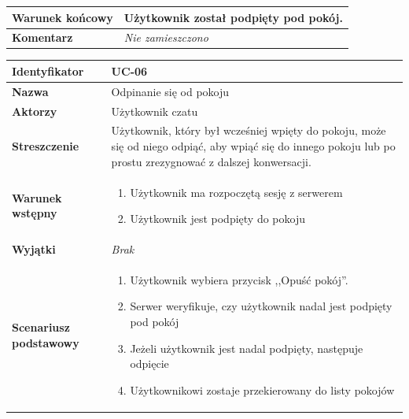 \documentclass[11pt,oneside,a4paper,titlepage,onecolumn]{article}
\newenvironment{enumreq}
{ \begin{enumerate}[topsep=0pt,itemsep=-1ex,partopsep=1ex,parsep=1ex] }
{ \end{enumerate}                  }
\begin{document}
{\begin{tabular}{ | l | l | }
	\hline
		\parbox[t]{4cm}{\textbf{Warunek końcowy}} & \parbox[t]{11cm}{
			Użytkownik został podpięty pod pokój.
		}
		\\
		
	\hline
		\parbox[t]{4cm}{\textbf{Komentarz}} & \parbox[t]{11cm}{
			\textit{Nie zamieszczono}
		}
		\\

	\hline
\end{tabular}

\vspace{2em}

\begin{tabular}{ | l | l | }
	\hline
		\textbf{Identyfikator} & 
		UC-06
		\\
		
	\hline
		\textbf{Nazwa} & 
		Odpinanie się od pokoju
		\\
		
	\hline
		\textbf{Aktorzy} & \parbox[t]{11cm}{
			Użytkownik czatu
		}\\
		 
	\hline
		\parbox[t]{4cm}{\textbf{Streszczenie}} & \parbox[t]{11cm}{
			Użytkownik, który był wcześniej wpięty do pokoju, może się
			od niego odpiąć, aby wpiąć się do innego pokoju lub po prostu
			zrezygnować z dalszej konwersacji.
			
		}\\
		
	\hline
		\parbox[t]{4cm}{\textbf{Warunek wstępny}} & \parbox[t]{11cm}{
			\begin{enumreq}
				\item Użytkownik ma rozpoczętą sesję z serwerem
				\item Użytkownik jest podpięty do pokoju
			\end{enumreq}
				
		}
		\\
		
	\hline
		\parbox[t]{4cm}{\textbf{Wyjątki}} & \parbox[t]{11cm}{
			\textit{Brak}
			
		}
		\\

	\hline
		\parbox[t]{4cm}{\textbf{Scenariusz podstawowy}} & \parbox[t]{11cm}{
			\begin{enumreq}
				\item Użytkownik wybiera przycisk ,,Opuść pokój''.
				\item Serwer weryfikuje, czy użytkownik nadal jest podpięty
				pod pokój
				\item Jeżeli użytkownik jest nadal podpięty, następuje
				odpięcie
				\item Użytkownikowi zostaje przekierowany do listy pokojów
			\end{enumreq}
		}
		\\
		

\end{tabular}}
\end{document}

